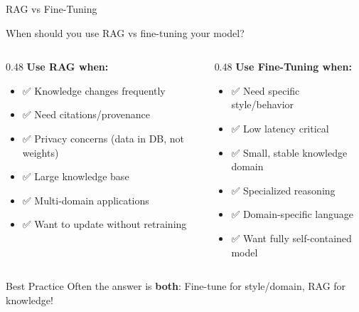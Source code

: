 \documentclass[aspectratio=169]{beamer}
\begin{document}
\begin{frame}[shrink=10]{RAG vs Fine-Tuning 🤔}
\begin{discussionbox}
When should you use RAG vs fine-tuning your model?
\end{discussionbox}

\vspace{0.5em}

\begin{columns}[T]
\begin{column}{0.48\textwidth}
\textbf{Use RAG when:}
\begin{itemize}\setlength{\itemsep}{0pt}
    \item ✅ Knowledge changes frequently
    \item ✅ Need citations/provenance
    \item ✅ Privacy concerns (data in DB, not weights)
    \item ✅ Large knowledge base
    \item ✅ Multi-domain applications
    \item ✅ Want to update without retraining
\end{itemize}
\end{column}

\begin{column}{0.48\textwidth}
\textbf{Use Fine-Tuning when:}
\begin{itemize}\setlength{\itemsep}{0pt}
    \item ✅ Need specific style/behavior
    \item ✅ Low latency critical
    \item ✅ Small, stable knowledge domain
    \item ✅ Specialized reasoning
    \item ✅ Domain-specific language
    \item ✅ Want fully self-contained model
\end{itemize}
\end{column}
\end{columns}

\vspace{0.5em}

\begin{alertblock}{Best Practice}
Often the answer is \textbf{both}: Fine-tune for style/domain, RAG for knowledge!
\end{alertblock}
\end{frame}
\end{document}
